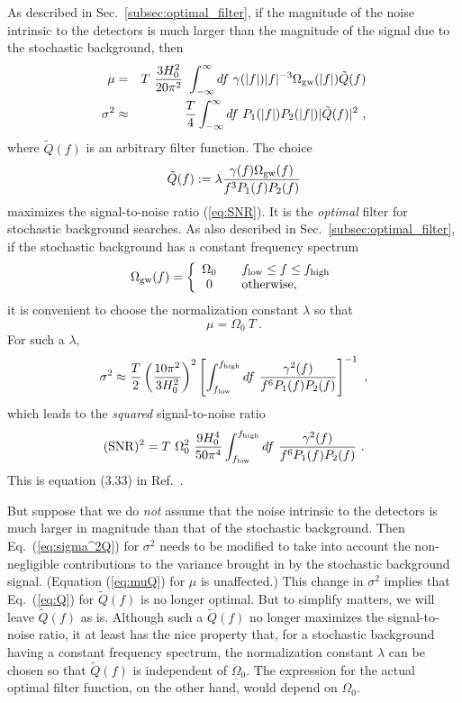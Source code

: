 As described in Sec.~\ref{subsec:optimal_filter}, if the magnitude 
of the noise intrinsic to the detectors is much larger than the 
magnitude of the signal due to the stochastic background, then
%
\begin{eqnarray}
\mu&=&T\ {3H_0^2\over 20 \pi^2}\ \int_{-\infty}^\infty df\ 
\gamma(|f|)|f|^{-3}\Omega_{\rm gw}(|f|)\tilde Q(f)
\label{eq:muQ}\\
\sigma^2&\approx&{T\over 4}\int_{-\infty}^\infty df\ P_1(|f|) P_2(|f|)
|\tilde Q(f)|^2\ ,
\label{eq:sigma^2Q}
\end{eqnarray}
%
where $\tilde Q(f)$ is an arbitrary filter function.
The choice 
%
\begin{equation}
\tilde Q(f):=\lambda{\gamma(f)\Omega_{\rm gw}(f)\over f^3 P_1(f) P_2(f)}
\label{eq:Q}
\end{equation}
%
maximizes the signal-to-noise ratio (\ref{eq:SNR}).
It is the {\it optimal} filter for stochastic background searches.
As also described in Sec.~\ref{subsec:optimal_filter},
if the stochastic background has a constant frequency spectrum
%
\[
\Omega_{\rm gw}(f)=\left\{
\begin{array}{cl}
\Omega_0 & \quad f_{\rm low}\le f \le f_{\rm high}\\
0        & \quad {\rm otherwise,}
\end{array}
\right.
\]
%
it is convenient to choose the normalization constant $\lambda$ so 
that 
%
\begin{equation}
\mu=\Omega_0\ T\ .
\label{eq:mu2}
\end{equation}
%
For such a $\lambda$, 
%
\begin{equation}
\sigma^2\approx{T\over 2}\left({10\pi^2\over 3 H_0^2}\right)^2
\left[\int_{f_{\rm low}}^{f_{\rm high}} 
df\ {\gamma^2(f)\over f^6 P_1(f) P_2(f)}\right]^{-1}\ ,
\label{eq:sigma1}
\end{equation}
%
which leads to the {\it squared} signal-to-noise ratio
%
\begin{equation}
({\rm SNR})^2=T\ \Omega_0^2\ {9 H_0^4\over 50\pi^4}
\int_{f_{\rm low}}^{f_{\rm high}} df\ {\gamma^2(f)\over f^6 P_1(f) P_2(f)}\ .
\label{eq:snr1}
\end{equation}
%
This is equation (3.33) in Ref.~\cite{AllenReview}.

But suppose that we do {\it not} assume that the noise intrinsic to 
the detectors is much larger in magnitude than that of the stochastic
background.
Then Eq.~(\ref{eq:sigma^2Q}) for $\sigma^2$ needs to be modified to 
take into account the non-negligible contributions to the variance 
brought in by the stochastic background signal.
(Equation (\ref{eq:muQ}) for $\mu$ is unaffected.)
This change in $\sigma^2$ implies that Eq.~(\ref{eq:Q}) for 
$\tilde Q(f)$ is no longer optimal.
But to simplify matters, we will leave $\tilde Q(f)$ as is.
Although such a $\tilde Q(f)$ no longer maximizes the signal-to-noise 
ratio, it at least has the nice property that, for a stochastic background 
having a constant frequency spectrum, the normalization constant $\lambda$ 
can be chosen so that $\tilde Q(f)$ is independent of $\Omega_0$.
The expression for the actual optimal filter function, on the other
hand, would depend on $\Omega_0$.


